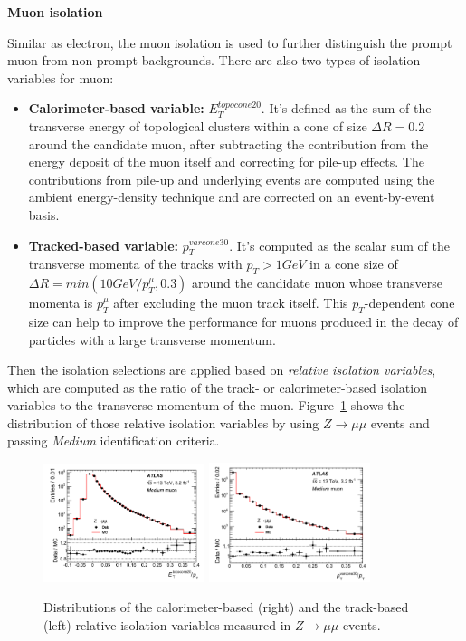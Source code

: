 \textbf{Muon isolation}

Similar as electron, the muon isolation is used to further distinguish the prompt muon from non-prompt backgrounds.
There are also two types of isolation variables for muon:
\begin{itemize}
	\item \textbf{Calorimeter-based variable:} $E_{T}^{topocone20}$. It's defined as the sum of the transverse energy of topological clusters within a cone of size $\Delta R = 0.2$ around the candidate muon, after subtracting the contribution from the energy deposit of the muon itself and correcting for pile-up effects. The contributions from pile-up and underlying events are computed using the ambient energy-density technique\cite{CACCIARI2008119} and are corrected on an event-by-event basis.
	\item \textbf{Tracked-based variable:} $p_{T}^{varcone30}$. It's computed as the scalar sum of the transverse momenta of the tracks with $p_{T} > 1 GeV$ in a cone size of $\Delta R = min(10 GeV/p_{T}^{\mu}, 0.3)$ around the candidate muon whose transverse momenta is $p_{T}^{\mu}$ after excluding the muon track itself. This $p_{T}$-dependent cone size can help to improve the performance for muons produced in the decay of particles with a large transverse momentum.
\end{itemize}

Then the isolation selections are applied based on \textit{relative isolation variables}, 
which are computed as the ratio of the track- or calorimeter-based isolation variables to the transverse momentum of the muon.
Figure~\ref{fig:muon_iso} shows the distribution of those relative isolation variables by using $Z \rightarrow \mu\mu$ events and passing \textit{Medium} identification criteria.
\begin{figure}[!htb]
  \centering
  \includegraphics[width=0.42\textwidth]{figures/Simulation/muon_iso_calo.png}
  \includegraphics[width=0.42\textwidth]{figures/Simulation/muon_iso_track.png}
  \caption{Distributions of the calorimeter-based (right) and the track-based (left) relative isolation variables measured in $Z \rightarrow \mu\mu$ events. }
  \label{fig:muon_iso}
\end{figure}
